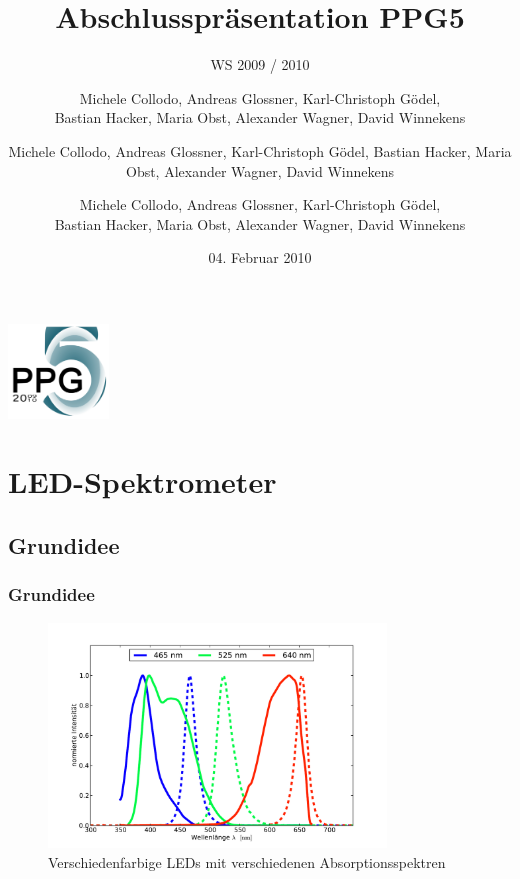 \documentclass[10pt]{beamer}
\title[Abschlusspr\"asentation]{Abschlusspr\"asentation PPG5}
\subtitle{WS 2009 / 2010}
\author[PPG5]{Michele Collodo, Andreas Glossner, Karl-Christoph G\"odel, \\ Bastian Hacker, Maria Obst, Alexander Wagner, David Winnekens}
\author[PPG5]{Michele Collodo, Andreas Glossner, Karl-Christoph G\"odel, Bastian Hacker, Maria Obst, Alexander Wagner, David Winnekens}
\author[PPG5]{Michele Collodo, Andreas Glossner, Karl-Christoph G\"odel,\\Bastian Hacker, Maria Obst, Alexander Wagner, David Winnekens}
\date{04. Februar 2010}
\begin{document}
\frame
{
\hfill
\includegraphics[width=0.20\textwidth]{images/ppg5logocrop.pdf}
\titlepage
}

\section{LED-Spektrometer}
\subsection[]{Grundidee}
\frame
{
\frametitle{Grundidee}
\begin{figure}
\begin{center}
\includegraphics[width=0.8\textwidth]{./images/absorp-emit.pdf}
\caption{Verschiedenfarbige LEDs mit verschiedenen Absorptionsspektren}
\end{center}
\end{figure}
}
\end{document}
